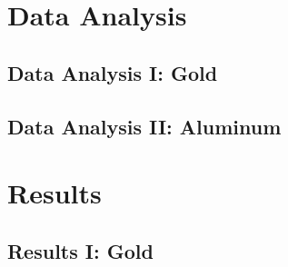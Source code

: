 \documentclass[a4paper]{article}
\begin{document}
\section{Data Analysis}

\subsection{Data Analysis I: Gold}

\qq

\qq 

\qq 

\qq 

\qq 

\subsection{Data Analysis II: Aluminum}

\qq

\qq 

\qq 

\qq 

\qq 

\section{Results}

\subsection{Results I: Gold}

\qq 

\qq 

\qq
\end{document}
